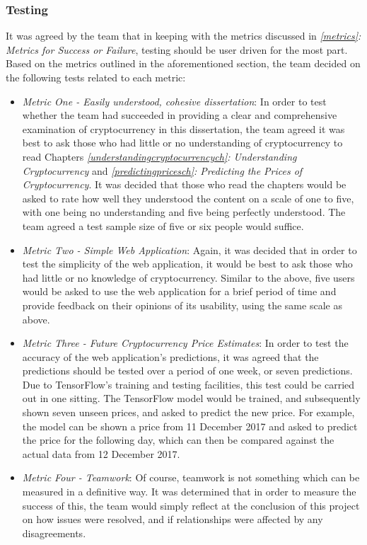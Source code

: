 \subsubsection{Testing}
It was agreed by the team that in keeping with the metrics discussed in \textit{\ref{metrics}: Metrics for Success or Failure}, testing should be user driven for the most part. Based on the metrics outlined in the aforementioned section, the team decided on the following tests related to each metric: 

\begin{itemize}
    \item\textit{Metric One - Easily understood, cohesive dissertation}: In order to test whether the team had succeeded in providing a clear and comprehensive examination of cryptocurrency in this dissertation, the team agreed it was best to ask those who had little or no understanding of cryptocurrency to read Chapters \textit{\ref{understandingcryptocurrencych}: Understanding Cryptocurrency} and \textit{\ref{predictingpricesch}: Predicting the Prices of Cryptocurrency}. It was decided that those who read the chapters would be asked to rate how well they understood the content on a scale of one to five, with one being no understanding and five being perfectly understood. The team agreed a test sample size of five or six people would suffice.
    \item\textit{Metric Two - Simple Web Application}: Again, it was decided that in order to test the simplicity of the web application, it would be best to ask those who had little or no knowledge of cryptocurrency. Similar to the above, five users would be asked to use the web application for a brief period of time and provide feedback on their opinions of its usability, using the same scale as above.
    \item\textit{Metric Three - Future Cryptocurrency Price Estimates}: In order to test the accuracy of the web application's predictions, it was agreed that the predictions should be tested over a period of one week, or seven predictions. Due to TensorFlow's training and testing facilities, this test could be carried out in one sitting. The TensorFlow model would be trained, and subsequently shown seven unseen prices, and asked to predict the new price. For example, the model can be shown a price from 11 December 2017 and asked to predict the price for the following day, which can then be compared against the actual data from 12 December 2017.
    \item\textit{Metric Four - Teamwork}: Of course, teamwork is not something which can be measured in a definitive way. It was determined that in order to measure the success of this, the team would simply reflect at the conclusion of this project on how issues were resolved, and if relationships were affected by any disagreements. 
\end{itemize}

